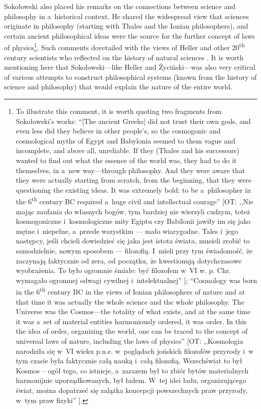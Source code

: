 Sokołowski also placed his remarks on the connections between science and philosophy in a~historical context. He shared the widespread view that sciences originate in philosophy (starting with Thales and the Ionian philosophers), and certain ancient philosophical ideas were the source for the further concept of laws of physics\footnote{To illustrate this comment, it is worth quoting two fragments from Sokołowski's works: ``[The ancient Greeks] did not trust their own gods, and even less did they believe in other people's, so the cosmogonic and cosmological myths of Egypt and Babylonia seemed to them vague and incomplete, and above all, unreliable. If they (Thales and his successors) wanted to find out what the essence of the world was, they had to do it themselves, in a~new way---through philosophy. And they were aware that they were actually starting from scratch, from the beginning, that they were questioning the existing ideas. It was extremely bold: to be a~philosopher in the 6\textsuperscript{th} century BC required a~huge civil and intellectual courage'' [OT: ,,Nie mając zaufania do własnych bogów, tym bardziej nie wierzyli cudzym, toteż kosmogoniczne i~kosmologiczne mity Egiptu czy Babilonii jawiły im się jako mętne i~niepełne, a~przede wszystkim --- mało wiarygodne. Tales i~jego następcy, jeśli chcieli dowiedzieć się jaka jest istota świata, musieli zrobić to samodzielnie, nowym sposobem --- filozofią. I~mieli przy tym świadomość, że zaczynają faktycznie od zera, od początku, że kwestionują dotychczasowe wyobrażenia. To było ogromnie śmiałe: być filozofem w~VI w. p. Chr. wymagało ogromnej odwagi cywilnej i~intelektualnej'' 
\parencite[][p.44]{}%
]; ``Cosmology was born in the 6\textsuperscript{th} century BC in the views of Ionian philosophers of nature and at that time it was actually the whole science and the whole philosophy. The Universe was the Cosmos---the totality of what exists, and at the same time it was a~set of material entities harmoniously ordered, it was order. In this the idea of order, organizing the world, one can be traced to the concept of universal laws of nature, including the laws of physics'' [OT: ,,Kosmologia narodziła się w~VI wieku p.n.e. w~poglądach jońskich filozofów przyrody i~w tym czasie była faktycznie całą nauką i~całą filozofią. Wszechświat to był Kosmos -- ogół tego, co istnieje, a~zarazem był to zbiór bytów materialnych harmonijnie uporządkowanych, był ładem. W~tej idei ładu, organizującego świat, można dopatrzeć się zalążka koncepcji powszechnych praw przyrody, w~tym praw fizyki'' 
\parencite[][p.28]{}%
]. }. Such comments dovetailed with the views of Heller 
\parencite[][]{Heller1992Filozofia} %
 and other 20\textsuperscript{th} century scientists who reflected on the history of natural sciences 
\parencites[][]{Wilson2011Konsiliencja}[][]{}. %
 It is worth mentioning here that Sokołowski---like Heller and Życiński---was also very critical of various attempts to construct philosophical systems (known from the history of science and philosophy) that would explain the nature of the entire world.



